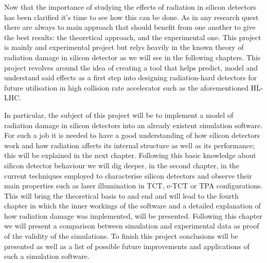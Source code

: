 Now that the importance of studying the effects of radiation in silicon detectors has been clarified it's time to see how this can be done. As in any research quest there are always to main approach that should benefit from one another to give the best results: the theoretical approach, and the experimental one. This project is mainly and experimental project but relys heavily in the known theory of radiation damage in silicon detector as we will see in the following chapters. This project revolves around the idea of creating a tool that helps predict, model and understand said effects as a first step into designing radiation-hard detectors for future utilisation in high collision rate accelerator such as the aforementioned HL-LHC.

In particular, the subject of this project will be to implement a model of radiation damage in silicon detectors into an already existent simulation software. For such a job it is needed to have a good understanding of how silicon detectors work and how radiation affects its internal structure as well as its performance; this will be explained in the next chapter. Following this basic knowledge about silicon detector behaviour we will dig deeper, in the second chapter, in the current techniques employed to characterise silicon detectors and observe their main properties such as laser illumination in TCT, e-TCT or TPA configurations. This will bring the theoretical basis to and end and will lead to the fourth chapter in which the inner workings of the software and a detailed explanation of how radiation damage was implemented, will be presented. Following this chapter we will present a comparison between simulation and experimental data as proof of the validity of the simulations. To finish this project conclusions will be presented as well as a list of possible future improvements and applications of such a simulation software.

